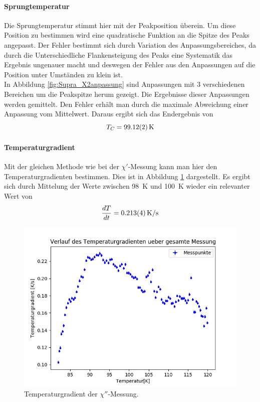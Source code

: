 \documentclass[12pt,a4paper]{article}
\begin{document}
\paragraph{Sprungtemperatur}
Die Sprungtemperatur stimmt hier mit der Peakposition überein. Um diese Position zu bestimmen wird eine quadratische Funktion an die Spitze des Peaks angepasst. Der Fehler bestimmt sich durch Variation des Anpassungsbereiches, da durch die Unterschiedliche Flankensteigung des Peaks eine Systematik das Ergebnis ungenauer macht und deswegen der Fehler aus den Anpassungen auf die Position unter Umständen zu klein ist.\\
In Abbildung \ref{fig:Supra_X2anpassung} sind Anpassungen mit 3 verschiedenen Bereichen um die Peakspitze herum gezeigt. Die Ergebnisse dieser Anpassungen werden gemittelt. Den Fehler erhält man durch die maximale Abweichung einer Anpassung vom Mittelwert. Daraus ergibt sich das Endergebnis von
\begin{equation*}
T_C = \SI{99.12\pm 0.02}{K}
\end{equation*}

\paragraph{Temperaturgradient}
Mit der gleichen Methode wie bei der $\chi'$-Messung kann man hier den Temperaturgradienten bestimmen. Dies ist in Abbildung \ref{fig:Supra_X2temp} dargestellt. Es ergibt sich durch Mittelung der Werte zwischen \SI{98}{K} und \SI{100}{K} wieder ein relevanter Wert von 
\begin{equation*}
\dfrac{dT}{dt} = \SI{0.213\pm 0.004}{K/s}
\end{equation*}

\begin{figure}
\centering
\includegraphics[scale=0.8]{Bilder/Haupt_Supra/X2_temp.png}
\caption{Temperaturgradient der $\chi''$-Messung.}
\label{fig:Supra_X2temp}
\end{figure}
\end{document}
